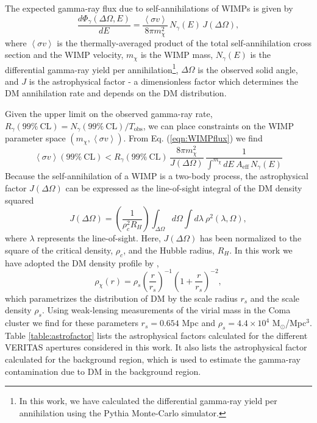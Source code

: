 \documentclass[12pt,manuscript]{aastex}
\newcommand{\expval}[1]{\left\langle #1 \right\rangle}
\begin{document}
The expected gamma-ray flux due to self-annihilations of WIMPs is given by
\begin{equation}
\frac{d\Phi_{\gamma}(\Delta\Omega,E)}{dE}=
\frac{\expval{\sigma v}}{8\pi m_{\chi}^{2}}\,N_\gamma (E)\, J(\Delta\Omega),
\label{eqn:WIMPflux}
\end{equation}
where $\expval{\sigma v}$ is the thermally-averaged product of the total self-annihilation cross
section and the WIMP velocity, $m_{\chi}$ is the WIMP mass, $N_\gamma (E)$ is the differential
gamma-ray yield per annihilation\footnote{In this work, we have calculated the differential
gamma-ray yield per annihilation using the Pythia Monte-Carlo simulator.}, $\Delta\Omega$ is the
observed solid angle, and $J$ is the astrophysical factor - a dimensionless factor which determines
the DM annihilation rate and depends on the DM distribution.

Given the upper limit on the observed gamma-ray rate,
$R_{\gamma}(99\%\ \mathrm{CL}) = N_{\gamma}(99\%\ \mathrm{CL}) / T_{\mathrm{obs}}$, we can place
constraints on the WIMP parameter space $(m_{\chi}, \expval{\sigma v})$. From Eq.
(\ref{eqn:WIMPflux}) we find
\begin{equation}
\expval{\sigma v}(99\%\ \mathrm{CL}) <
R_{\gamma}(99\%\ \mathrm{CL})\, \frac{8\pi m_{\chi}^{2}}{J(\Delta\Omega)}\,
\frac{1}{\int^{m_{\chi}} dE\ A_{\mathrm{eff}}\,N_\gamma (E)}
\end{equation}
Because the self-annihilation of a WIMP is a two-body process, the astrophysical factor
$J(\Delta\Omega)$ can be expressed as the line-of-sight integral of the DM density squared
\begin{equation}
J(\Delta\Omega)=\left(\frac{1}{\rho_{c}^{2}R_{H}}\right)
\int_{\Delta\Omega}d\Omega\int d\lambda\ \rho^{2}(\lambda,\Omega),
\end{equation}
where $\lambda$ represents the line-of-sight. Here,
$J(\Delta\Omega)$ has been normalized to the square of the critical density, $\rho_{c}$, and the
Hubble radius, $R_{H}$. In this work we have adopted the DM density profile by
\citet{article:NavarroFrenkWhite:1997},
\begin{equation}
\rho_{\chi}(r)=\rho_{s}\left(\frac{r}{r_{s}}\right)^{-1}\left(1+\frac{r}{r_{s}}\right)^{-2},
\end{equation}
which parametrizes the distribution of DM by the scale radius $r_{s}$ and the scale density
$\rho_{s}$. Using weak-lensing measurements of the virial mass in the Coma cluster
\citep{article:Gavazzi_etal:2009} we find for these parameters $r_{s}=0.654$ Mpc and
$\rho_{s}=4.4\times 10^{4}$ M$_{\odot}$/Mpc$^{3}$. Table \ref{table:astrofactor} lists the
astrophysical factors calculated for the different VERITAS apertures considered in this work.
It also lists the astrophysical factor calculated for the background region, which is used
to estimate the gamma-ray contamination due to DM in the background region.
\end{document}
